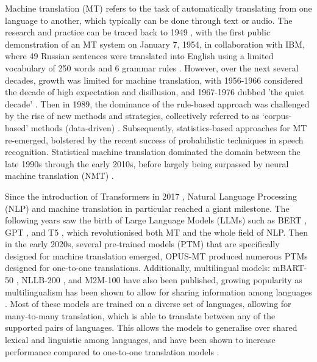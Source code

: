 \documentclass[a4paper, 11pt]{article}
\begin{document}
Machine translation (MT) refers to the task of automatically translating from one language to another, which typically can be done through text or audio. The research and practice can be traced back to 1949 \cite{weaver-1999}, with the first public demonstration of an MT system on January 7, 1954, in collaboration with IBM, where 49 Russian sentences were translated into English using a limited vocabulary of 250 words and 6 grammar rules \cite{hutchins-2006-first-mt}. However, over the next several decades, growth was limited for machine translation, with 1956-1966 considered the decade of high expectation and disillusion, and 1967-1976 dubbed 'the quiet decade' \cite{hutchins-2001-mt-50-years}. Then in 1989, the dominance of the rule-based approach was challenged by the rise of new methods and strategies, collectively referred to as ‘corpus-based’ methods (data-driven) \cite{hutchins-1994-research-methods-mt,hutchins-1998-development-mt}. Subsequently, statistics-based approaches for MT re-emerged, bolstered by the recent success of probabilistic techniques in speech recognition. Statistical machine translation \cite{lopez-2008-smt} dominated the domain between the late 1990s through the early 2010s, before largely being surpassed by neural machine translation (NMT) \cite{cho-2014-properties,sutskever-2014-seq2seq}.

Since the introduction of Transformers in 2017 \cite{vaswani-2017-attention}, Natural Language Processing (NLP) and machine translation in particular reached a giant milestone. The following years saw the birth of Large Language Models (LLMs) such as BERT \cite{devlin-2019-bert}, GPT \cite{openai-2024-gpt4}, and T5 \cite{raffel-2023-t5}, which revolutionised both MT and the whole field of NLP. Then in the early 2020s, several pre-trained models (PTM) that are specifically designed for machine translation emerged, OPUS-MT \cite{tiedemann-2020-opus-mt} produced numerous PTMs designed for one-to-one translations. Additionally, multilingual models: mBART-50 \cite{liu-2020-mbart}, NLLB-200 \cite{nllb200-2020}, and M2M-100 \cite{fan-2020-m2m100} have also been published, growing popularity as multilingualism has been shown to allow for sharing information among languages \cite{garcia-2020-multilingual}. Most of these models are trained on a diverse set of languages, allowing for many-to-many translation, which is able to translate between any of the supported pairs of languages. This allows the models to generalise over shared lexical and linguistic among languages, and have been shown to increase performance compared to one-to-one translation models \cite{liu-2020-mbart}.
\end{document}
